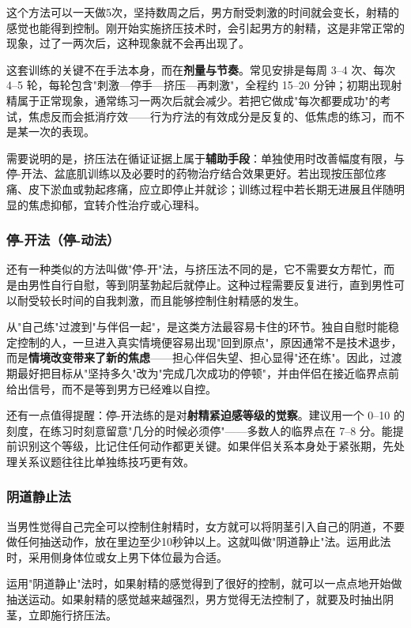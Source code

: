 \documentclass[12pt,a4paper,twoside]{ctexbook}
\begin{document}
这个方法可以一天做5次，坚持数周之后，男方耐受刺激的时间就会变长，射精的感觉也能得到控制。刚开始实施挤压技术时，会引起男方的射精，这是非常正常的现象，过了一两次后，这种现象就不会再出现了。


这套训练的关键不在手法本身，而在\textbf{剂量与节奏}。常见安排是每周 3--4 次、每次 4--5 轮，每轮包含"刺激—停手—挤压—再刺激"，全程约 15--20 分钟；初期出现射精属于正常现象，通常练习一两次后就会减少。若把它做成"每次都要成功"的考试，焦虑反而会抵消疗效——行为疗法的有效成分是反复的、低焦虑的练习，而不是某一次的表现。

需要说明的是，挤压法在循证证据上属于\textbf{辅助手段}：单独使用时改善幅度有限，与停-开法、盆底肌训练以及必要时的药物治疗结合效果更好。若出现按压部位疼痛、皮下淤血或勃起疼痛，应立即停止并就诊；训练过程中若长期无进展且伴随明显的焦虑抑郁，宜转介性治疗或心理科。

\subsubsection{停-开法（停-动法）}

还有一种类似的方法叫做"停-开"法，与挤压法不同的是，它不需要女方帮忙，而是由男性自行自慰，等到阴茎勃起后就停止。这种过程需要反复进行，直到男性可以耐受较长时间的自我刺激，而且能够控制住射精感的发生。


从"自己练"过渡到"与伴侣一起"，是这类方法最容易卡住的环节。独自自慰时能稳定控制的人，一旦进入真实情境便容易出现"回到原点"，原因通常不是技术退步，而是\textbf{情境改变带来了新的焦虑}——担心伴侣失望、担心显得"还在练"。因此，过渡期最好把目标从"坚持多久"改为"完成几次成功的停顿"，并由伴侣在接近临界点前给出信号，而不是等到男方已经难以自控。

还有一点值得提醒：停-开法练的是对\textbf{射精紧迫感等级的觉察}。建议用一个 0--10 的刻度，在练习时刻意留意"几分的时候必须停"——多数人的临界点在 7--8 分。能提前识别这个等级，比记住任何动作都更关键。如果伴侣关系本身处于紧张期，先处理关系议题往往比单独练技巧更有效。

\subsubsection{阴道静止法}

当男性觉得自己完全可以控制住射精时，女方就可以将阴茎引入自己的阴道，不要做任何抽送动作，放在里边至少10秒钟以上。这就叫做"阴道静止"法。运用此法时，采用侧身体位或女上男下体位最为合适。

运用"阴道静止"法时，如果射精的感觉得到了很好的控制，就可以一点点地开始做抽送运动。如果射精的感觉越来越强烈，男方觉得无法控制了，就要及时抽出阴茎，立即施行挤压法。
\end{document}
